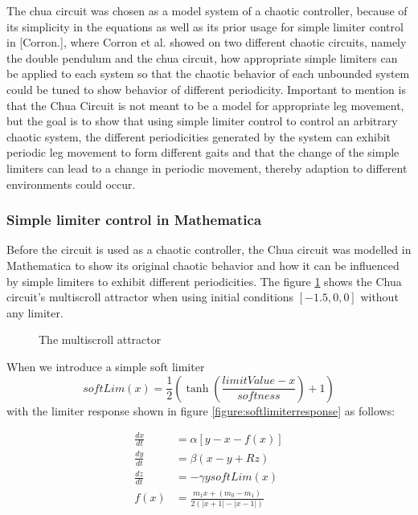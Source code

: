 \documentclass[main]{subfiles}
\begin{document}
\begin{comment}
dx/dt = c1*(y - x - f (x)) // m0 : slope in outer region
    dy/dt = c2*(x - y + z)    // m1 : slope in inner region
    dz/dt = -c3*y         // b : Breakpoints
    f (x) = m1*x + (m0 - m1)/2*(| x + 1 | -| x - 1 |)
\end{comment}

The chua circuit was chosen as a model system of a chaotic controller, because of its simplicity in the equations as well as its prior usage for simple limiter control in [Corron.], where Corron et al. showed on two different chaotic circuits, namely the double pendulum and the chua circuit, how appropriate simple limiters can be applied to each system so that the chaotic behavior of each unbounded system could be tuned to show behavior of different periodicity. Important to mention is that the Chua Circuit is not meant to be a model for appropriate leg movement, but the goal is to show that using simple limiter control to control an arbitrary chaotic system, the different periodicities generated by the system can exhibit periodic leg movement to form different gaits and that the change of the simple limiters can lead to a change in periodic movement, thereby adaption to different environments could occur. 

\subsubsection{Simple limiter control in Mathematica}

Before the circuit is used as a chaotic controller, the Chua circuit was modelled in Mathematica to show its original chaotic behavior and how it can be influenced by simple limiters to exhibit different periodicities. The figure \ref{figure:chaoticchuacircuit} shows the Chua circuit's multiscroll attractor when using initial conditions \([-1.5,0,0]\) without any limiter.

\begin{figure}[!h]
\centering
{}
\caption[The multiscroll attractor]{The multiscroll attractor}
\label{figure:chaoticchuacircuit}
\end{figure}

When we introduce a simple soft limiter \[softLim(x) = \frac{1}{2} \left(\tanh\left(\frac{limitValue - x}{softness}\right) + 1\right)\] with the limiter response shown in figure \ref{figure:softlimiterresponse} as follows:

\begin{align*}
\frac{dx}{dt}&=\alpha [y-x-f(x)] \\
\frac{dy}{dt}&=\beta (x-y+Rz)\\
\frac{dz}{dt}&=-\gamma y softLim(x)\\
f (x) &= \frac{m_1 x + (m_0 - m_1)}{2 (| x + 1 | -| x - 1 |)}
\end{align*}
\end{document}
